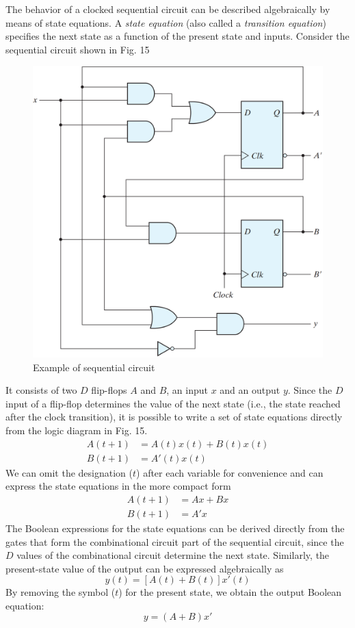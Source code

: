 The behavior of a clocked sequential circuit can be described algebraically by means of state equations. A \textit{state equation} (also called a \textit{transition equation}) specifies the next state as a function of the present state and inputs. Consider the sequential circuit shown in Fig. 15
\begin{figure}[H]
  \centering
  \includegraphics[width=\linewidth]{img/fig-5.15.png}
  \caption{Example of sequential circuit}
  \label{fig:5.15}
\end{figure}
It consists of two $D$ flip-flops $A$ and $B$, an input $x$ and an output $y$. Since the $D$ input of a flip-flop determines the value of the next state (i.e., the state reached after the clock transition), it is possible to write a set of state equations directly from the logic diagram in Fig. 15.
\begin{align*}
  A(t + 1) &= A(t)x(t) + B(t)x(t)\\
  B(t + 1) &= A'(t)x(t)
\end{align*}
We can omit the designation ($t$) after each variable for convenience and can express the state equations in the more compact form
\begin{align*}
  A(t + 1) &= Ax + Bx\\
  B(t + 1) &= A'x
\end{align*}
The Boolean expressions for the state equations can be derived directly from the gates that form the combinational circuit part of the sequential circuit, since the $D$ values of the combinational circuit determine the next state. Similarly, the present-state value of the output can be expressed algebraically as
\begin{equation*}
  y(t) = [A(t) + B(t)]x'(t)
\end{equation*}
By removing the symbol ($t$) for the present state, we obtain the output Boolean equation:
\begin{equation*}
  y = (A + B)x'
\end{equation*}


